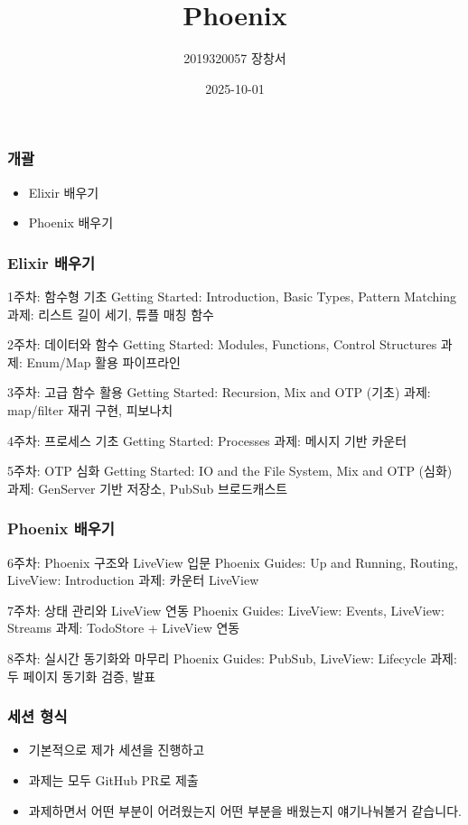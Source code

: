 \documentclass{beamer}
\title{Phoenix}
\author{2019320057 장창서}
\date{2025-10-01}
\begin{document}
\frame{\titlepage}

\begin{frame}
\frametitle{개괄}

\begin{itemize}
\item Elixir 배우기
\item Phoenix 배우기
\end{itemize}
\end{frame}

\begin{frame}
\frametitle{Elixir 배우기}

1주차: 함수형 기초
Getting Started: Introduction, Basic Types, Pattern Matching
과제: 리스트 길이 세기, 튜플 매칭 함수

2주차: 데이터와 함수
Getting Started: Modules, Functions, Control Structures
과제: Enum/Map 활용 파이프라인

3주차: 고급 함수 활용
Getting Started: Recursion, Mix and OTP (기초)
과제: map/filter 재귀 구현, 피보나치

4주차: 프로세스 기초
Getting Started: Processes
과제: 메시지 기반 카운터

5주차: OTP 심화
Getting Started: IO and the File System, Mix and OTP (심화)
과제: GenServer 기반 저장소, PubSub 브로드캐스트
\end{frame}

\begin{frame}
\frametitle{Phoenix 배우기}

6주차: Phoenix 구조와 LiveView 입문
Phoenix Guides: Up and Running, Routing, LiveView: Introduction
과제: 카운터 LiveView

7주차: 상태 관리와 LiveView 연동
Phoenix Guides: LiveView: Events, LiveView: Streams
과제: TodoStore + LiveView 연동

8주차: 실시간 동기화와 마무리
Phoenix Guides: PubSub, LiveView: Lifecycle
과제: 두 페이지 동기화 검증, 발표
\end{frame}

\begin{frame}
\frametitle{세션 형식}

\begin{itemize}
\item 기본적으로 제가 세션을 진행하고
\item 과제는 모두 GitHub PR로 제출
\item 과제하면서 어떤 부분이 어려웠는지 어떤 부분을 배웠는지 얘기나눠볼거 같습니다.
\end{itemize}
\end{frame}
\end{document}
